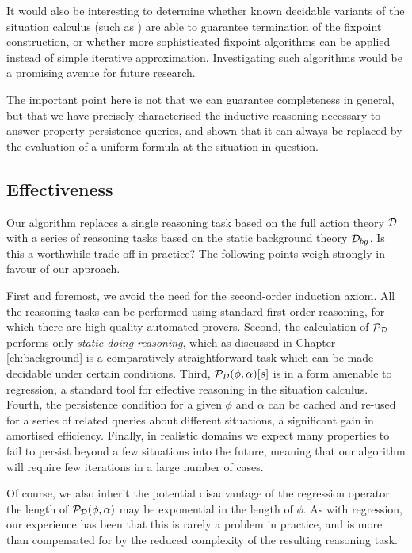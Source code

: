 It would also be interesting to determine whether known decidable
variants of the situation calculus (such as \citep{yu07twovar_sitcalc})
are able to guarantee termination of the fixpoint construction, or
whether more sophisticated fixpoint algorithms can be applied instead
of simple iterative approximation. Investigating such algorithms would
be a promising avenue for future research.

The important point here is not that we can guarantee completeness
in general, but that we have precisely characterised the inductive
reasoning necessary to answer property persistence queries, and shown
that it can always be replaced by the evaluation of a uniform formula
at the situation in question.


\subsection{Effectiveness\label{sec:Persistence:Effectiveness}}

Our algorithm replaces a single reasoning task based on the full action
theory $\mathcal{D}$ with a series of reasoning tasks based on the static
background theory $\mathcal{D}_{bg}$. Is this a worthwhile trade-off in practice?
The following points weigh strongly in favour of our approach.

First and foremost, we avoid the need for the second-order induction
axiom. All the reasoning tasks can be performed using standard first-order
reasoning, for which there are high-quality automated provers. Second,
the calculation of $\mathcal{P}_{\mathcal{D}}$ performs only \emph{static doing
reasoning}, which as discussed in Chapter \ref{ch:background} is
a comparatively straightforward task which can be made decidable under
certain conditions. Third, $\mathcal{P}_{\mathcal{D}}(\phi,\alpha)[s]$ is in a form
amenable to regression, a standard tool for effective reasoning in
the situation calculus. Fourth, the persistence condition for a given
$\phi$ and $\alpha$ can be cached and re-used for a series of related
queries about different situations, a significant gain in amortised
efficiency. Finally, in realistic domains we expect many properties
to fail to persist beyond a few situations into the future, meaning
that our algorithm will require few iterations in a large number of
cases.

Of course, we also inherit the potential disadvantage of the regression
operator: the length of $\mathcal{P}_{\mathcal{D}}(\phi,\alpha)$ may be exponential
in the length of $\phi$. As with regression, our experience has been
that this is rarely a problem in practice, and is more than compensated
for by the reduced complexity of the resulting reasoning task.


